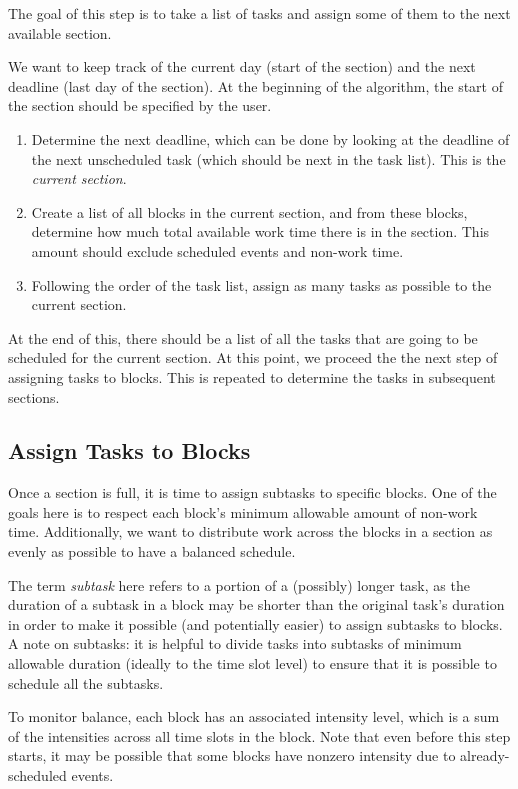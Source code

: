 \documentclass{article}
\begin{document}
		The goal of this step is to take a list of tasks and assign some of them to the next available section.
		
		We want to keep track of the current day (start of the section) and the next deadline (last day of the section).
		At the beginning of the algorithm, the start of the section should be specified by the user.
		\begin{enumerate}
			\item 
				Determine the next deadline, which can be done by looking at the deadline of the next unscheduled task (which should be next in the task list). This is the \emph{current section}.
			\item 
				Create a list of all blocks in the current section, and from these blocks, determine how much total available work time there is in the section.
				This amount should exclude scheduled events and non-work time.
			\item
				Following the order of the task list, assign as many tasks as possible to the current section.
		\end{enumerate}
		At the end of this, there should be a list of all the tasks that are going to be scheduled for the current section.
		At this point, we proceed the the next step of assigning tasks to blocks.
		This is repeated to determine the tasks in subsequent sections.
		
	\subsection{Assign Tasks to Blocks}
		Once a section is full, it is time to assign subtasks to specific blocks.
		One of the goals here is to respect each block's minimum allowable amount of non-work time.
		Additionally, we want to distribute work across the blocks in a section as evenly as possible to have a balanced schedule.
		
		The term \emph{subtask} here refers to a portion of a (possibly) longer task, as the duration of a subtask in a block may be shorter than the original task's duration in order to make it possible (and potentially easier) to assign subtasks to blocks.
		A note on subtasks: it is helpful to divide tasks into subtasks of minimum allowable duration (ideally to the time slot level) to ensure that it is possible to schedule all the subtasks.
		
		To monitor balance, each block has an associated intensity level, which is a sum of the intensities across all time slots in the block.
		Note that even before this step starts, it may be possible that some blocks have nonzero intensity due to already-scheduled events.
		
\end{document}
